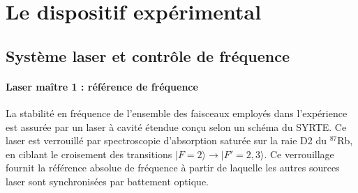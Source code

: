\section{Le dispositif expérimental}
\subsection{Système laser et contrôle de fréquence}
\label{sec:systeme_laser}


\paragraph{Laser maître 1 : référence de fréquence}
La stabilité en fréquence de l’ensemble des faisceaux employés dans l’expérience est assurée par un laser à cavité étendue conçu selon un schéma du \gls{SYRTE}. Ce laser est verrouillé par spectroscopie d’absorption saturée sur la raie D2 du $^{87}$Rb, en ciblant le croisement des transitions $|F=2\rangle \rightarrow |F'=2,3\rangle$. Ce verrouillage fournit la référence absolue de fréquence à partir de laquelle les autres sources laser sont synchronisées par battement optique.

%

